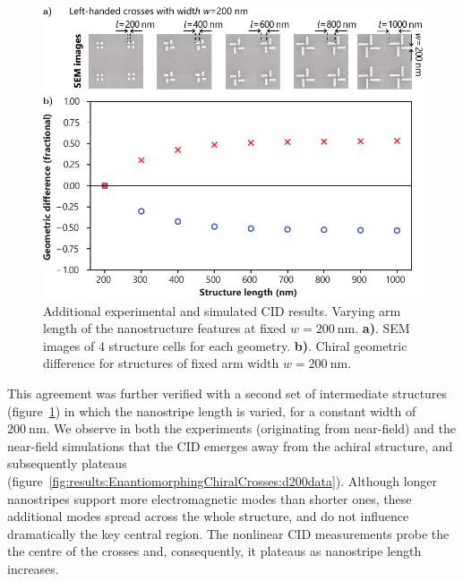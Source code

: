 \begin{figure}[htb!]	
    \centering	
    \includegraphics[scale=1]{./figures/results/EnantiomorphingChiralCrosses/d200structures.pdf}
    \caption{\label{fig:results:EnantiomorphingChiralCrosses:d200structures}
    Additional experimental and simulated CID results. Varying arm length of the nanostructure features at fixed $w=\SI{200}{\nano\m}$. \textbf{a)}. SEM images of 4 structure cells for each geometry. \textbf{b)}. Chiral geometric difference for structures of fixed arm width $w=\SI{200}{\nano\m}$.}	
\end{figure}

This agreement was further verified with a second set of intermediate structures (figure~\ref{fig:results:EnantiomorphingChiralCrosses:d200structures}) in which the nanostripe length is varied, for a constant width of $\SI{200}{\nano\m}$. We observe in both the experiments (originating from near-field) and the near-field simulations that the CID emerges away from the achiral structure, and subsequently plateaus (figure~\ref{fig:results:EnantiomorphingChiralCrosses:d200data}). Although longer nanostripes support more electromagnetic modes than shorter ones, these additional modes spread across the whole structure, and do not influence dramatically the key central region. The nonlinear CID measurements probe the the centre of the crosses and, consequently, it plateaus as nanostripe length increases.

